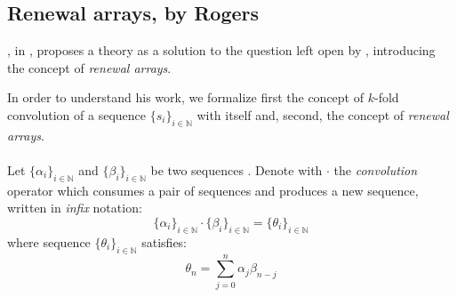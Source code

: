 
\subsection{Renewal arrays, by Rogers}
\label{sec:back:to:the:basics:rogers}

\citeauthor{rogers:1977}, in \cite{rogers:1977}, proposes a theory
as a solution to the question left open by \citeauthor{shapiro:1976}, 
introducing the concept of \emph{renewal arrays}.

In order to understand his work, we formalize first the concept of $k$-fold
convolution of a sequence $\lbrace s_{i}\rbrace_{i\in\mathbb{N}}$ 
with itself and, second, the concept of \emph{renewal arrays}.
\\\\
Let $\lbrace \alpha_{i}\rbrace_{i\in\mathbb{N}}$ and 
$\lbrace \beta_{i}\rbrace_{i\in\mathbb{N}}$ be two sequences
. Denote
with $\cdot$ the \emph{convolution} operator which consumes a pair
of sequences and produces a new sequence, written in \emph{infix} 
notation:
\begin{displaymath}
    \lbrace \alpha_{i}\rbrace_{i\in\mathbb{N}}\cdot
    \lbrace \beta_{i}\rbrace_{i\in\mathbb{N}} =
    \lbrace \theta_{i}\rbrace_{i\in\mathbb{N}}
\end{displaymath}
where sequence  $\lbrace \theta_{i}\rbrace_{i\in\mathbb{N}}$ satisfies:
\begin{displaymath}
    \theta_{n}=\sum_{j=0}^{n}{\alpha_{j}\beta_{n-j}}
\end{displaymath}

